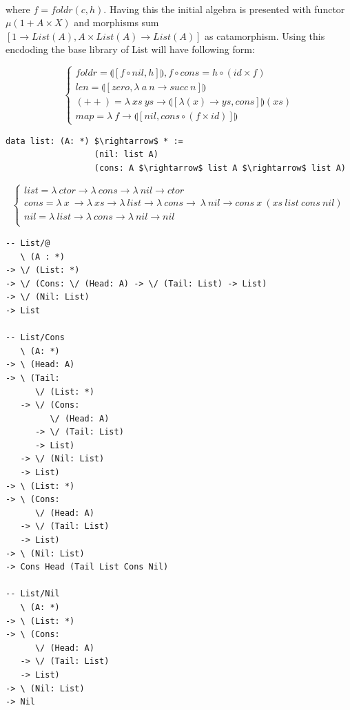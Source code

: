 \documentclass[11pt,oneside]{article}
\begin{document}
\paragraph{}
where $f = foldr(c,h)$. Having this the initial algebra is presented with functor
$\mu (1 + A \times X)$ and morphisms sum $[1 \rightarrow List(A), A \times List(A) \rightarrow List(A)]$
as catamorphism. Using this encdoding the base library of List will have following form:

\vspace{0.5cm}
$$
\begin{cases}
foldr = \llparenthesis [ f \circ nil , h] \rrparenthesis, f \circ cons = h \circ (id \times f)\\
len = \llparenthesis [ zero, \lambda\ a\ n \rightarrow succ\ n ] \rrparenthesis \\
(++) = \lambda\ xs\ ys \rightarrow \llparenthesis [ \lambda (x) \rightarrow ys, cons ] \rrparenthesis (xs) \\
map = \lambda\ f \rightarrow \llparenthesis [ nil, cons \circ (f \times id)] \rrparenthesis
\end{cases}
$$

\begin{lstlisting}[mathescape=true]
             data list: (A: *) $\rightarrow$ * :=
                  (nil: list A)
                  (cons: A $\rightarrow$ list A $\rightarrow$ list A)
\end{lstlisting}

$$
\begin{cases}
list = \lambda\ ctor \rightarrow \lambda\ cons \rightarrow \lambda\ nil \rightarrow ctor\\
cons = \lambda\ x\ \rightarrow \lambda\ xs \rightarrow \lambda\ list \rightarrow \lambda\ cons \rightarrow\ \lambda\ nil \rightarrow cons\ x\ (xs\ list\ cons\ nil)\\
nil = \lambda\ list \rightarrow \lambda\ cons \rightarrow \lambda\ nil \rightarrow nil\\
\end{cases}
$$

\begin{lstlisting}[mathescape=true]
-- List/@
   \ (A : *)
-> \/ (List: *)
-> \/ (Cons: \/ (Head: A) -> \/ (Tail: List) -> List)
-> \/ (Nil: List)
-> List

-- List/Cons
   \ (A: *)
-> \ (Head: A)
-> \ (Tail:
      \/ (List: *)
   -> \/ (Cons:
         \/ (Head: A)
      -> \/ (Tail: List)
      -> List)
   -> \/ (Nil: List)
   -> List)
-> \ (List: *)
-> \ (Cons:
      \/ (Head: A)
   -> \/ (Tail: List)
   -> List)
-> \ (Nil: List)
-> Cons Head (Tail List Cons Nil)

-- List/Nil
   \ (A: *)
-> \ (List: *)
-> \ (Cons:
      \/ (Head: A)
   -> \/ (Tail: List)
   -> List)
-> \ (Nil: List)
-> Nil
\end{lstlisting}
\end{document}
